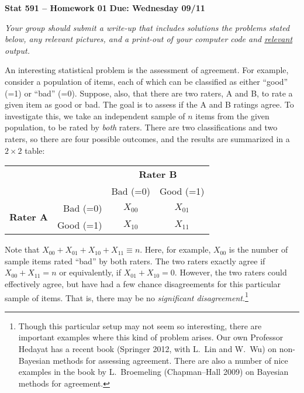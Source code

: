 \documentclass[a4paper,12pt]{article}
\begin{document}
\noindent \large \textbf{Stat 591 -- Homework 01} \hfill \textbf{Due: Wednesday 09/11} \normalsize

\medskip

\noindent \emph{Your group should submit a write-up that includes solutions the problems stated below, any relevant pictures, and a print-out of your computer code and \underline{relevant} output.}  

\medskip

An interesting statistical problem is the assessment of agreement.  For example, consider a population of items, each of which can be classified as either ``good'' (=1) or ``bad'' (=0).  Suppose, also, that there are two raters, A and B, to rate a given item as good or bad.  The goal is to assess if the A and B ratings agree.  To investigate this, we take an independent sample of $n$ items from the given population, to be rated by \emph{both} raters.  There are two classifications and two raters, so there are four possible outcomes, and the results are summarized in a $2 \times 2$ table:
\begin{center}
\begin{tabular}{ cr|c|c| }
\multicolumn{2}{r}{} & \multicolumn{2}{c}{{\bf Rater B}} \\
\multicolumn{2}{r}{} & \multicolumn{1}{c}{Bad (=0)} & \multicolumn{1}{c}{Good (=1)} \\
\cline{3-4}
\multirow{2}{*}{{\bf Rater A}} 
& Bad (=0) & $X_{00}$ & $X_{01}$ \\
\cline{3-4}
& Good (=1) & $X_{10}$ & $X_{11}$ \\
\cline{3-4}
\end{tabular}
\end{center}
Note that $X_{00} + X_{01} + X_{10} + X_{11} \equiv n$.  Here, for example, $X_{00}$ is the number of sample items rated ``bad'' by both raters.  The two raters exactly agree if $X_{00} + X_{11} = n$ or equivalently, if $X_{01} + X_{10} = 0$.  However, the two raters could effectively agree, but have had a few chance disagreements for this particular sample of items.  That is, there may be no \emph{significant disagreement}.\footnote{Though this particular setup may not seem so interesting, there are important examples where this kind of problem arises.  Our own Professor Hedayat has a recent book (Springer 2012, with L.~Lin and W.~Wu) on non-Bayesian methods for assessing agreement.  There are also a number of nice examples in the book by L.~Broemeling (Chapman--Hall 2009) on Bayesian methods for agreement.}  
\end{document}
